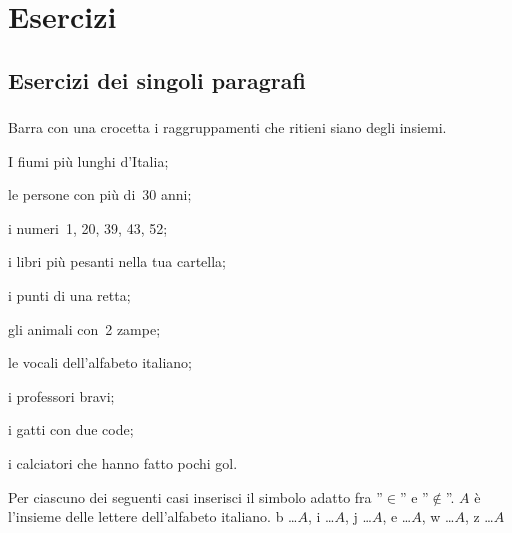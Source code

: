 
\section{Esercizi}

\subsection{Esercizi dei singoli paragrafi}

\subsubsection*{}

\begin{esercizio}
 \label{ese:5.1}
 Barra con una crocetta i raggruppamenti che ritieni siano degli insiemi.
 \begin{multicols}{2}
 \begin{enumeratea}
\item I fiumi più lunghi d'Italia;
\item le persone con più di~30 anni;
\item i numeri~1, 20, 39, 43, 52;
\item i libri più pesanti nella tua cartella;
\item i punti di una retta;
\item gli animali con~2 zampe;
\item le vocali dell'alfabeto italiano;
\item i professori bravi;
\item i gatti con due code;
\item i calciatori che hanno fatto pochi gol.
\end{enumeratea}
\end{multicols}
\end{esercizio}

\begin{esercizio}
 \label{ese:5.2}
Per ciascuno dei seguenti casi inserisci il simbolo adatto fra ''\(\in\)'' e 
''\(\notin\)''. \(A\) è l'insieme delle lettere
dell'alfabeto italiano. b \ldots \(A\), i \ldots \(A\), j \ldots \(A\), e \ldots \(A\), 
w \ldots \(A\), z \ldots \(A\)
\end{esercizio}

